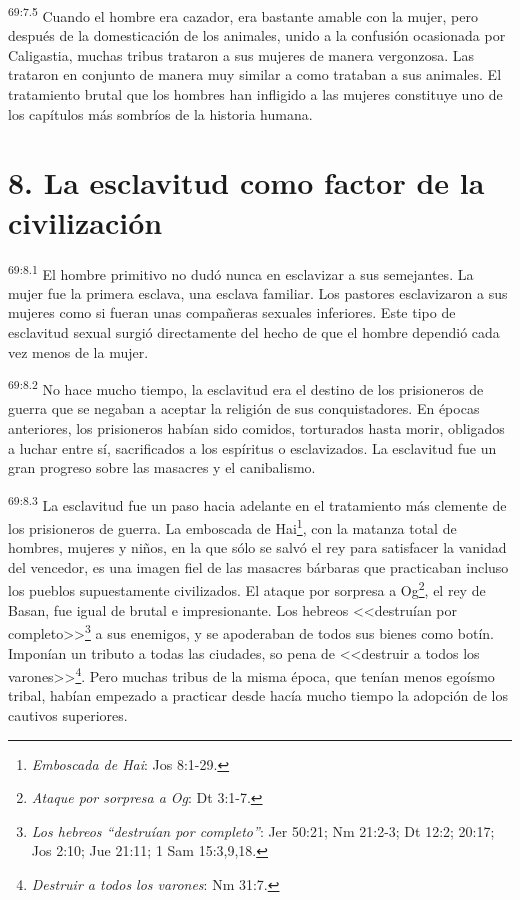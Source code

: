 \documentclass[twoside, 11pt]{book}
\begin{document}
\par
\textsuperscript{69:7.5} Cuando el hombre era cazador, era bastante amable con la mujer, pero después de la domesticación de los animales, unido a la confusión ocasionada por Caligastia, muchas tribus trataron a sus mujeres de manera vergonzosa. Las trataron en conjunto de manera muy similar a como trataban a sus animales. El tratamiento brutal que los hombres han infligido a las mujeres constituye uno de los capítulos más sombríos de la historia humana.

\section*{8. La esclavitud como factor de la civilización}
\par
\textsuperscript{69:8.1} El hombre primitivo no dudó nunca en esclavizar a sus semejantes. La mujer fue la primera esclava, una esclava familiar. Los pastores esclavizaron a sus mujeres como si fueran unas compañeras sexuales inferiores. Este tipo de esclavitud sexual surgió directamente del hecho de que el hombre dependió cada vez menos de la mujer.

\par
\textsuperscript{69:8.2} No hace mucho tiempo, la esclavitud era el destino de los prisioneros de guerra que se negaban a aceptar la religión de sus conquistadores. En épocas anteriores, los prisioneros habían sido comidos, torturados hasta morir, obligados a luchar entre sí, sacrificados a los espíritus o esclavizados. La esclavitud fue un gran progreso sobre las masacres y el canibalismo.

\par
\textsuperscript{69:8.3} La esclavitud fue un paso hacia adelante en el tratamiento más clemente de los prisioneros de guerra. La emboscada de Hai\footnote{\textit{Emboscada de Hai}: Jos 8:1-29.}, con la matanza total de hombres, mujeres y niños, en la que sólo se salvó el rey para satisfacer la vanidad del vencedor, es una imagen fiel de las masacres bárbaras que practicaban incluso los pueblos supuestamente civilizados. El ataque por sorpresa a Og\footnote{\textit{Ataque por sorpresa a Og}: Dt 3:1-7.}, el rey de Basan, fue igual de brutal e impresionante. Los hebreos <<destruían por completo>>\footnote{\textit{Los hebreos ``destruían por completo''}: Jer 50:21; Nm 21:2-3; Dt 12:2; 20:17; Jos 2:10; Jue 21:11; 1 Sam 15:3,9,18.} a sus enemigos, y se apoderaban de todos sus bienes como botín. Imponían un tributo a todas las ciudades, so pena de <<destruir a todos los varones>>\footnote{\textit{Destruir a todos los varones}: Nm 31:7.}. Pero muchas tribus de la misma época, que tenían menos egoísmo tribal, habían empezado a practicar desde hacía mucho tiempo la adopción de los cautivos superiores.
\end{document}
